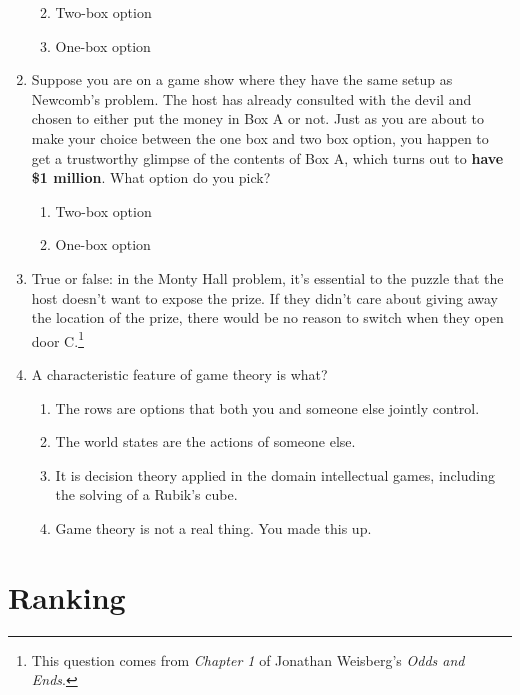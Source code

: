 \documentclass[]{tufte-book}
\providecommand{\tightlist}{%
  \setlength{\itemsep}{0pt}\setlength{\parskip}{0pt}}
\begin{document}
\begin{enumerate}
  \begin{enumerate}
  \def\labelenumii{\alph{enumii}.}
  \tightlist
  \item
    Two-box option
  \item
    One-box option
  \end{enumerate}
\item
  Suppose you are on a game show where they have the same setup as Newcomb's problem. The host has already consulted with the devil and chosen to either put the money in Box A or not. Just as you are about to make your choice between the one box and two box option, you happen to get a trustworthy glimpse of the contents of Box A, which turns out to \textbf{have \$1 million}. What option do you pick?

  \begin{enumerate}
  \def\labelenumii{\alph{enumii}.}
  \tightlist
  \item
    Two-box option
  \item
    One-box option
  \end{enumerate}
\item
  True or false: in the Monty Hall problem, it's essential to the puzzle that the host doesn't want to expose the prize. If they didn't care about giving away the location of the prize, there would be no reason to switch when they open door C.\footnote{This question comes from \emph{Chapter 1} of Jonathan Weisberg's \emph{Odds and Ends}.}
\item
  A characteristic feature of game theory is what?

  \begin{enumerate}
  \def\labelenumii{\alph{enumii}.}
  \tightlist
  \item
    The rows are options that both you and someone else jointly control.
  \item
    The world states are the actions of someone else.
  \item
    It is decision theory applied in the domain intellectual games, including the solving of a Rubik's cube.
  \item
    Game theory is not a real thing. You made this up.
  \end{enumerate}
\end{enumerate}

\hypertarget{ranking}{%
\chapter{Ranking}\label{ranking}}
\end{document}
